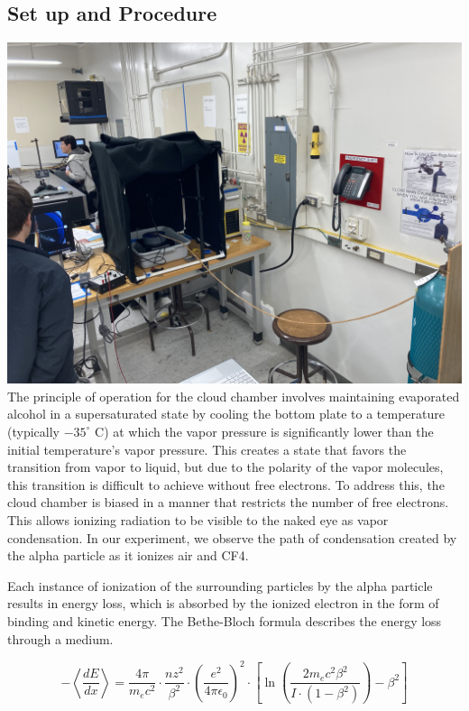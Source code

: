 \documentclass[a4paper]{tufte-handout}
\begin{document}
\subsection{Set up and Procedure}

\includegraphics[width= 1 \linewidth]{figures/day1_setup.jpg}
\\
The principle of operation for the cloud chamber involves maintaining evaporated alcohol in a supersaturated state by cooling the bottom plate to a temperature (typically $-35^\circ$ C) at which the vapor pressure is significantly lower than the initial temperature's vapor pressure. This creates a state that favors the transition from vapor to liquid, but due to the polarity of the vapor molecules, this transition is difficult to achieve without free electrons. To address this, the cloud chamber is biased in a manner that restricts the number of free electrons. This allows ionizing radiation to be visible to the naked eye as vapor condensation. In our experiment, we observe the path of condensation created by the alpha particle as it ionizes air and CF4.

Each instance of ionization of the surrounding particles by the alpha particle results in energy loss, which is absorbed by the ionized electron in the form of binding and kinetic energy. The Bethe-Bloch formula describes the energy loss through a medium.

$$-\left<\frac{dE}{dx}\right> = \frac{4\pi}{m_ec^2}\cdot\frac{nz^2}{\beta^2}\cdot\left(\frac{e^2}{4\pi\epsilon_0}\right)^2\cdot\left[\ln\left(\frac{2m_ec^2\beta^2}{I\cdot(1-\beta^2)}\right)-\beta^2\right]$$
\end{document}
